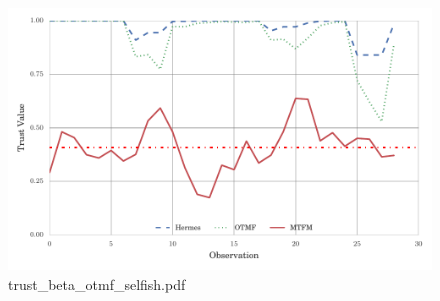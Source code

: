 \documentclass{article}
\begin{document}
\begin{figure}[h!]
\centering
\includegraphics[width=\linewidth]{trust_beta_otmf_selfish.pdf}
\caption{trust\_beta\_otmf\_selfish.pdf}
\end{figure}
\end{document}
